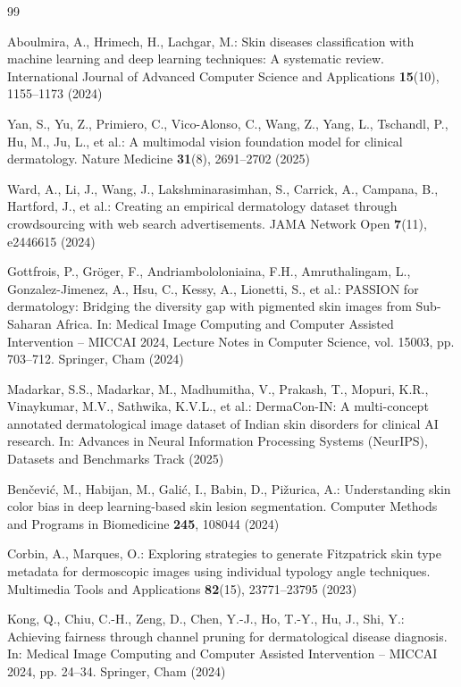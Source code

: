 \documentclass[pdflatex,sn-mathphys-num]{sn-jnl}%
\begin{document}
\begin{thebibliography}{99}

Aboulmira, A., Hrimech, H., Lachgar, M.: Skin diseases classification with machine learning
and deep learning techniques: A systematic review. International Journal of Advanced Computer
Science and Applications \textbf{15}(10), 1155--1173 (2024)

Yan, S., Yu, Z., Primiero, C., Vico-Alonso, C., Wang, Z., Yang, L., Tschandl, P., Hu, M.,
Ju, L., et al.: A multimodal vision foundation model for clinical dermatology. Nature Medicine
\textbf{31}(8), 2691--2702 (2025)

Ward, A., Li, J., Wang, J., Lakshminarasimhan, S., Carrick, A., Campana, B., Hartford, J.,
et al.: Creating an empirical dermatology dataset through crowdsourcing with web search
advertisements. JAMA Network Open \textbf{7}(11), e2446615 (2024)

Gottfrois, P., Gr\"{o}ger, F., Andriambololoniaina, F.H., Amruthalingam, L.,
Gonzalez-Jimenez, A., Hsu, C., Kessy, A., Lionetti, S., et al.: PASSION for dermatology:
Bridging the diversity gap with pigmented skin images from Sub-Saharan Africa. In: Medical
Image Computing and Computer Assisted Intervention -- MICCAI 2024, Lecture Notes in Computer
Science, vol. 15003, pp. 703--712. Springer, Cham (2024)

Madarkar, S.S., Madarkar, M., Madhumitha, V., Prakash, T., Mopuri, K.R., Vinaykumar, M.V.,
Sathwika, K.V.L., et al.: DermaCon-IN: A multi-concept annotated dermatological image dataset
of Indian skin disorders for clinical AI research. In: Advances in Neural Information
Processing Systems (NeurIPS), Datasets and Benchmarks Track (2025)

Ben\v{c}evi\'{c}, M., Habijan, M., Gali\'{c}, I., Babin, D., Pi\v{z}urica, A.: Understanding
skin color bias in deep learning-based skin lesion segmentation. Computer Methods and Programs
in Biomedicine \textbf{245}, 108044 (2024)

Corbin, A., Marques, O.: Exploring strategies to generate Fitzpatrick skin type metadata for
dermoscopic images using individual typology angle techniques. Multimedia Tools and
Applications \textbf{82}(15), 23771--23795 (2023)

Kong, Q., Chiu, C.-H., Zeng, D., Chen, Y.-J., Ho, T.-Y., Hu, J., Shi, Y.: Achieving fairness
through channel pruning for dermatological disease diagnosis. In: Medical Image Computing and
Computer Assisted Intervention -- MICCAI 2024, pp. 24--34. Springer, Cham (2024)


\end{thebibliography}
\end{document}
